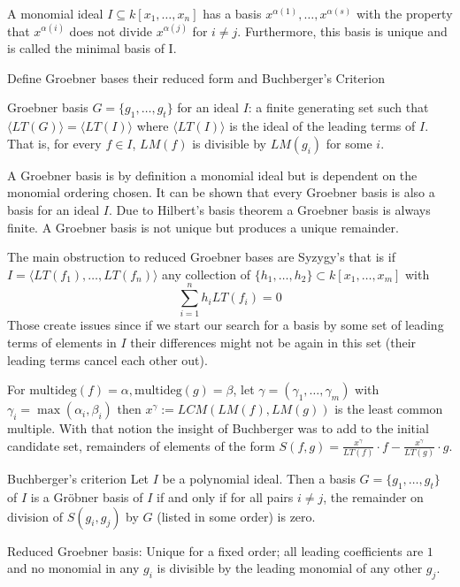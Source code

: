 {A monomial ideal \( I \subseteq k[x_1, \dots, x_n] \) has a basis \( x^{\alpha(1)}, \dots, x^{\alpha(s)} \) with
the property that \( x^{\alpha(i)} \) does not divide \( x^{\alpha(j)} \) for \( i \neq j \). 
Furthermore, this basis is unique and is called the minimal basis of I.


Define Groebner bases their reduced form and Buchberger’s Criterion

Groebner basis \( G = \{g_1,\ldots,g_t\} \) for an ideal \( I \): a finite generating set such that 
\( \langle LT(G) \rangle = \langle LT(I) \rangle \) where \( \langle LT(I) \rangle \) is the ideal of the leading terms of \( I \).
That is, for every \( f \in I \), \( LM(f) \) is divisible by \( LM(g_i) \) for some \( i \).

A Groebner basis is by definition a monomial ideal but is dependent on the monomial ordering chosen.
It can be shown that every Groebner basis is also a basis for an ideal \( I \).
Due to Hilbert's basis theorem a Groebner basis is always finite.
A Groebner basis is not unique but produces a unique remainder.

The main obstruction to reduced Groebner bases are Syzygy's that is if \( I = \langle LT(f_1), \dots, LT(f_n) \rangle \)
any collection of \( \{h_1, \dots, h_2\} \subset k[x_1, \dots, x_m] \) with
\[
    \sum_{i=1}^n h_i LT(f_i) = 0
\]
Those create issues since if we start our search for a basis by some set of leading terms of elements in \( I \)
their differences might not be again in this set (their leading terms cancel each other out).

For \( \text{multideg}(f) = \alpha, \text{multideg}(g) = \beta \), 
let \( \gamma = (\gamma_1, \dots, \gamma_m) \) with \( \gamma_i = \max(\alpha_i, \beta_i) \)
then \( x^\gamma := LCM(LM(f), LM(g)) \) is the least common multiple.
With that notion the insight of Buchberger was to add to the initial candidate set, remainders of elements of the form 
\( S(f, g) = \frac{x^\gamma}{LT(f)}\cdot f - \frac{x^\gamma}{LT(g)} \cdot g \).

Buchberger's criterion
Let \( I \) be a polynomial ideal. Then a basis
\( G = \{g_1, \dots, g_t \}  \) of \( I \) is a Gröbner basis of \( I \) if and only if for all pairs \( i \neq j \), the
remainder on division of \( S(g_i, g_j) \) by \( G \) (listed in some order) is zero.


Reduced Groebner basis: 
Unique for a fixed order; all leading coefficients are \( 1 \) and no monomial in any \( g_i \) 
is divisible by the leading monomial of any other \( g_j \).

}
